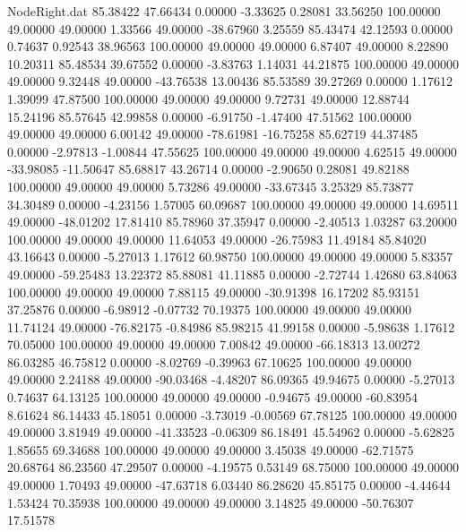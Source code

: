 \begin{filecontents}{NodeRight.dat}
  85.38422   47.66434    0.00000    -3.33625    0.28081   33.56250  100.00000   49.00000   49.00000    1.33566   49.00000  -38.67960    3.25559
  85.43474   42.12593    0.00000     0.74637    0.92543   38.96563  100.00000   49.00000   49.00000    6.87407   49.00000    8.22890   10.20311
  85.48534   39.67552    0.00000    -3.83763    1.14031   44.21875  100.00000   49.00000   49.00000    9.32448   49.00000  -43.76538   13.00436
  85.53589   39.27269    0.00000     1.17612    1.39099   47.87500  100.00000   49.00000   49.00000    9.72731   49.00000   12.88744   15.24196
  85.57645   42.99858    0.00000    -6.91750   -1.47400   47.51562  100.00000   49.00000   49.00000    6.00142   49.00000  -78.61981  -16.75258
  85.62719   44.37485    0.00000    -2.97813   -1.00844   47.55625  100.00000   49.00000   49.00000    4.62515   49.00000  -33.98085  -11.50647
  85.68817   43.26714    0.00000    -2.90650    0.28081   49.82188  100.00000   49.00000   49.00000    5.73286   49.00000  -33.67345    3.25329
  85.73877   34.30489    0.00000    -4.23156    1.57005   60.09687  100.00000   49.00000   49.00000   14.69511   49.00000  -48.01202   17.81410
  85.78960   37.35947    0.00000    -2.40513    1.03287   63.20000  100.00000   49.00000   49.00000   11.64053   49.00000  -26.75983   11.49184
  85.84020   43.16643    0.00000    -5.27013    1.17612   60.98750  100.00000   49.00000   49.00000    5.83357   49.00000  -59.25483   13.22372
  85.88081   41.11885    0.00000    -2.72744    1.42680   63.84063  100.00000   49.00000   49.00000    7.88115   49.00000  -30.91398   16.17202
  85.93151   37.25876    0.00000    -6.98912   -0.07732   70.19375  100.00000   49.00000   49.00000   11.74124   49.00000  -76.82175   -0.84986
  85.98215   41.99158    0.00000    -5.98638    1.17612   70.05000  100.00000   49.00000   49.00000    7.00842   49.00000  -66.18313   13.00272
  86.03285   46.75812    0.00000    -8.02769   -0.39963   67.10625  100.00000   49.00000   49.00000    2.24188   49.00000  -90.03468   -4.48207
  86.09365   49.94675    0.00000    -5.27013    0.74637   64.13125  100.00000   49.00000   49.00000   -0.94675   49.00000  -60.83954    8.61624
  86.14433   45.18051    0.00000    -3.73019   -0.00569   67.78125  100.00000   49.00000   49.00000    3.81949   49.00000  -41.33523   -0.06309
  86.18491   45.54962    0.00000    -5.62825    1.85655   69.34688  100.00000   49.00000   49.00000    3.45038   49.00000  -62.71575   20.68764
  86.23560   47.29507    0.00000    -4.19575    0.53149   68.75000  100.00000   49.00000   49.00000    1.70493   49.00000  -47.63718    6.03440
  86.28620   45.85175    0.00000    -4.44644    1.53424   70.35938  100.00000   49.00000   49.00000    3.14825   49.00000  -50.76307   17.51578

\end{filecontents}
